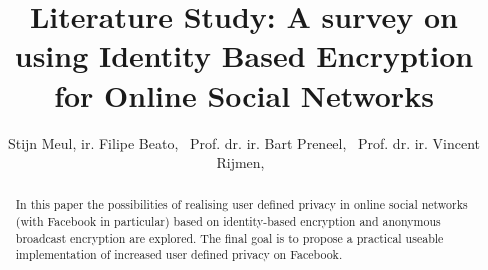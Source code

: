 \documentclass[journal]{IEEEtran}
\begin{document}
%
\title{Literature Study: A survey on using Identity Based Encryption for Online
Social Networks}
%
%
%

\author{Stijn Meul,
        ir. Filipe Beato,~
        Prof. dr. ir. Bart Preneel,~
        Prof. dr. ir. Vincent Rijmen,~%
        }

\markboth{}%
{}
% 

\maketitle

\begin{abstract}
In this paper the possibilities of realising user defined privacy in online
social networks (with Facebook in particular) based on identity-based
encryption and anonymous broadcast encryption are explored. The final goal is
to propose a practical useable implementation of increased user defined privacy
on Facebook.
\end{abstract}







%
\IEEEpeerreviewmaketitle
\end{document}
